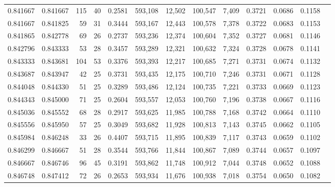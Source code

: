 \begin{tabular}{rrrrrrrrrrrrr}
0.841667 & 0.841667 &    115 &    40 &                                     0.2581 & 593,108 &  12,502 & 100,547 &   7,409 & 0.3721 & 0.0686 & 0.1158 \\
0.841667 & 0.841825 &     59 &    31 &                                     0.3444 & 593,167 &  12,443 & 100,578 &   7,378 & 0.3722 & 0.0683 & 0.1153 \\
0.841865 & 0.842778 &     69 &    26 &                                     0.2737 & 593,236 &  12,374 & 100,604 &   7,352 & 0.3727 & 0.0681 & 0.1146 \\
0.842796 & 0.843333 &     53 &    28 &                                     0.3457 & 593,289 &  12,321 & 100,632 &   7,324 & 0.3728 & 0.0678 & 0.1141 \\
0.843333 & 0.843681 &    104 &    53 &                                     0.3376 & 593,393 &  12,217 & 100,685 &   7,271 & 0.3731 & 0.0674 & 0.1132 \\
0.843687 & 0.843947 &     42 &    25 &                                     0.3731 & 593,435 &  12,175 & 100,710 &   7,246 & 0.3731 & 0.0671 & 0.1128 \\
0.844048 & 0.844330 &     51 &    25 &                                     0.3289 & 593,486 &  12,124 & 100,735 &   7,221 & 0.3733 & 0.0669 & 0.1123 \\
0.844343 & 0.845000 &     71 &    25 &                                     0.2604 & 593,557 &  12,053 & 100,760 &   7,196 & 0.3738 & 0.0667 & 0.1116 \\
0.845036 & 0.845552 &     68 &    28 &                                     0.2917 & 593,625 &  11,985 & 100,788 &   7,168 & 0.3742 & 0.0664 & 0.1110 \\
0.845556 & 0.845950 &     57 &    25 &                                     0.3049 & 593,682 &  11,928 & 100,813 &   7,143 & 0.3745 & 0.0662 & 0.1105 \\
0.845984 & 0.846248 &     33 &    26 &                                     0.4407 & 593,715 &  11,895 & 100,839 &   7,117 & 0.3743 & 0.0659 & 0.1102 \\
0.846299 & 0.846667 &     51 &    28 &                                     0.3544 & 593,766 &  11,844 & 100,867 &   7,089 & 0.3744 & 0.0657 & 0.1097 \\
0.846667 & 0.846746 &     96 &    45 &                                     0.3191 & 593,862 &  11,748 & 100,912 &   7,044 & 0.3748 & 0.0652 & 0.1088 \\
0.846748 & 0.847412 &     72 &    26 &                                     0.2653 & 593,934 &  11,676 & 100,938 &   7,018 & 0.3754 & 0.0650 & 0.1082 \\

\end{tabular}
